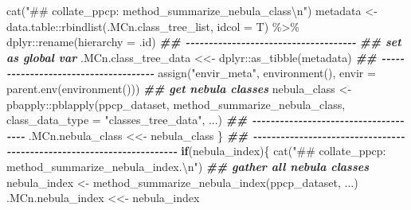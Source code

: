 \documentclass[
]{article}
\newenvironment{Shaded}{\begin{snugshade}}{\end{snugshade}}
\newcommand{\AttributeTok}[1]{\textcolor[rgb]{0.77,0.63,0.00}{#1}}
\newcommand{\ControlFlowTok}[1]{\textcolor[rgb]{0.13,0.29,0.53}{\textbf{#1}}}
\newcommand{\DocumentationTok}[1]{\textcolor[rgb]{0.56,0.35,0.01}{\textbf{\textit{#1}}}}
\newcommand{\FunctionTok}[1]{\textcolor[rgb]{0.00,0.00,0.00}{#1}}
\newcommand{\NormalTok}[1]{#1}
\newcommand{\OtherTok}[1]{\textcolor[rgb]{0.56,0.35,0.01}{#1}}
\newcommand{\SpecialCharTok}[1]{\textcolor[rgb]{0.00,0.00,0.00}{#1}}
\newcommand{\StringTok}[1]{\textcolor[rgb]{0.31,0.60,0.02}{#1}}
\begin{document}
\begin{Shaded}
\begin{Highlighting}[]
      \FunctionTok{cat}\NormalTok{(}\StringTok{"\#\# collate\_ppcp: method\_summarize\_nebula\_class}\SpecialCharTok{\textbackslash{}n}\StringTok{"}\NormalTok{)}
\NormalTok{      metadata }\OtherTok{\textless{}{-}}\NormalTok{ data.table}\SpecialCharTok{::}\FunctionTok{rbindlist}\NormalTok{(.MCn.class\_tree\_list, }\AttributeTok{idcol =}\NormalTok{ T) }\SpecialCharTok{\%\textgreater{}\%}
\NormalTok{        dplyr}\SpecialCharTok{::}\FunctionTok{rename}\NormalTok{(}\AttributeTok{hierarchy =}\NormalTok{ .id)}
      \DocumentationTok{\#\# {-}{-}{-}{-}{-}{-}{-}{-}{-}{-}{-}{-}{-}{-}{-}{-}{-}{-}{-}{-}{-}{-}{-}{-}{-}{-}{-}{-}{-}{-}{-}{-}{-}{-}{-}{-}{-} }
      \DocumentationTok{\#\# set as global var}
\NormalTok{      .MCn.class\_tree\_data }\OtherTok{\textless{}\textless{}{-}}\NormalTok{ dplyr}\SpecialCharTok{::}\FunctionTok{as\_tibble}\NormalTok{(metadata)}
      \DocumentationTok{\#\# {-}{-}{-}{-}{-}{-}{-}{-}{-}{-}{-}{-}{-}{-}{-}{-}{-}{-}{-}{-}{-}{-}{-}{-}{-}{-}{-}{-}{-}{-}{-}{-}{-}{-}{-}{-}{-} }
      \FunctionTok{assign}\NormalTok{(}\StringTok{"envir\_meta"}\NormalTok{, }\FunctionTok{environment}\NormalTok{(), }\AttributeTok{envir =} \FunctionTok{parent.env}\NormalTok{(}\FunctionTok{environment}\NormalTok{()))}
      \DocumentationTok{\#\# get nebula classes}
\NormalTok{      nebula\_class }\OtherTok{\textless{}{-}}\NormalTok{ pbapply}\SpecialCharTok{::}\FunctionTok{pblapply}\NormalTok{(ppcp\_dataset, method\_summarize\_nebula\_class, }
                             \AttributeTok{class\_data\_type =} \StringTok{"classes\_tree\_data"}\NormalTok{,}
\NormalTok{                             ...)}
      \DocumentationTok{\#\# {-}{-}{-}{-}{-}{-}{-}{-}{-}{-}{-}{-}{-}{-}{-}{-}{-}{-}{-}{-}{-}{-}{-}{-}{-}{-}{-}{-}{-}{-}{-}{-}{-}{-}{-}{-}{-} }
\NormalTok{      .MCn.nebula\_class }\OtherTok{\textless{}\textless{}{-}}\NormalTok{ nebula\_class}
\NormalTok{    \}}
    \DocumentationTok{\#\# {-}{-}{-}{-}{-}{-}{-}{-}{-}{-}{-}{-}{-}{-}{-}{-}{-}{-}{-}{-}{-}{-}{-}{-}{-}{-}{-}{-}{-}{-}{-}{-}{-}{-}{-}{-}{-}{-}{-}{-}{-}{-}{-}{-}{-}{-}{-}{-}{-}{-}{-}{-}{-}{-}{-}{-}{-}{-}{-}{-}{-}{-}{-}{-}{-}{-}{-}{-}{-}{-} }
    \ControlFlowTok{if}\NormalTok{(nebula\_index)\{}
      \FunctionTok{cat}\NormalTok{(}\StringTok{"\#\# collate\_ppcp: method\_summarize\_nebula\_index.}\SpecialCharTok{\textbackslash{}n}\StringTok{"}\NormalTok{)}
      \DocumentationTok{\#\# gather all nebula classes}
\NormalTok{      nebula\_index }\OtherTok{\textless{}{-}} \FunctionTok{method\_summarize\_nebula\_index}\NormalTok{(ppcp\_dataset,}
\NormalTok{                                                    ...)}
\NormalTok{      .MCn.nebula\_index }\OtherTok{\textless{}\textless{}{-}}\NormalTok{ nebula\_index}

\end{Highlighting}
\end{Shaded}
\end{document}
